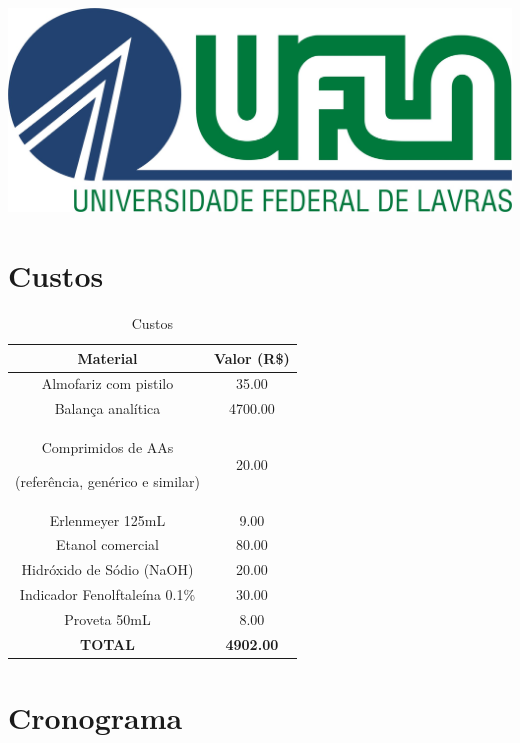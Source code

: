 \documentclass[
	12pt,				%
	openright,			%
	twoside,			%
	a4paper,			%
	english,			%
	french,				%
	spanish,			%
	brazil,				%
	]{abntex2}
\begin{document}

\frenchspacing 


\begin{titlepage}
    \begin{centering}
        \includegraphics[scale=0.45]{figuras/logo_ufla}%

        \vspace{1cm}
    \end{centering}
\end{titlepage}
\imprimircapa

\imprimirfolhaderosto

\tableofcontents*
\cleardoublepage
\textual

    

     

     \chapter{Custos} \label{sec:Custos}
     \begin{table}[H]
         \label{t:custos}
         \centering
         \begin{tabular}{|c | c| }
             \hline
             \textbf{Material} & \textbf{Valor (R\$)} \\
             \hline
             Almofariz com pistilo & 35.00\\ \hline
             Balança analítica & 4700.00 \\ \hline
             Comprimidos de AAs 
             \par(referência, genérico e similar) & 20.00 \\ \hline
             Erlenmeyer 125mL & 9.00 \\ \hline
             Etanol comercial & 80.00 \\ \hline
             Hidróxido de Sódio (NaOH) & 20.00 \\ \hline
             Indicador Fenolftaleína 0.1\% & 30.00 \\ \hline
             Proveta 50mL & 8.00 \\ \hline
             \textbf{TOTAL} & \textbf{4902.00} \\ \hline
         \end{tabular}
         \caption{Custos}
     \end{table}

     

     \chapter{Cronograma} \label{sec:Cronograma}

     \newpage
\posttextual



\printindex
\end{document}
